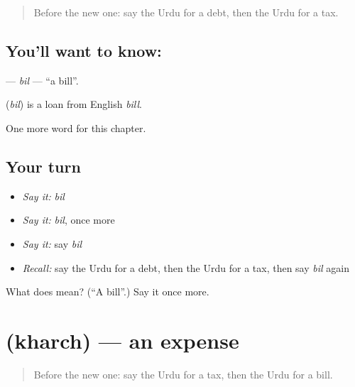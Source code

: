 \label{lesson:UR-C209-bil}



\begin{quote}
Before the new one: say the Urdu for a debt, then the Urdu for a tax.
\end{quote}

\subsection*{You'll want to know: }
\textbf{} — \emph{bil} — \textquotedblleft{}a bill\textquotedblright{}.

\begin{cousinweb}
\textbf{} (\emph{bil}) is a loan from English \emph{bill}.
\end{cousinweb}

\begin{grammarlens}[title={What you've built}]
One more word for this chapter.
\end{grammarlens}

\subsection*{Your turn}
\begin{itemize}
\raggedright
  \item \emph{Say it:} \emph{bil}
  \item \emph{Say it:} \emph{bil}, once more
  \item \emph{Say it:} say \emph{bil}
  \item \emph{Recall:} say the Urdu for a debt, then the Urdu for a tax, then say \emph{bil} again
\end{itemize}

\begin{tcolorbox}[breakable,colback=teal!4,colframe=teal!35!black,title={Before you move on}]
What does  mean? (\textquotedblleft{}A bill\textquotedblright{}.) Say it once more.
\end{tcolorbox}
\section[\texorpdfstring{\ur{خرچ} (kharch)}{خرچ (kharch)}]{ (kharch) — an expense}

\label{lesson:UR-C209-kharch}



\begin{quote}
Before the new one: say the Urdu for a tax, then the Urdu for a bill.
\end{quote}

